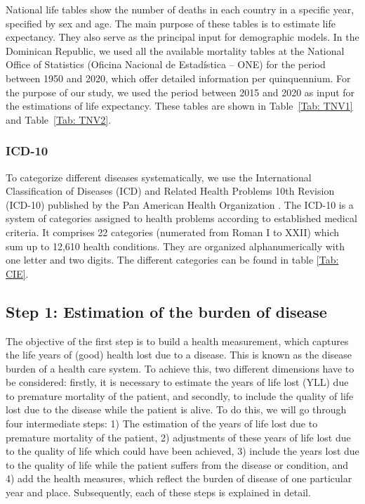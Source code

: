 \documentclass[11pt]{article}
\numberwithin{equation}{section}
\theoremstyle{remark}
\begin{document}
National life tables show the number of deaths in each country in a specific year, specified by sex and age. The main purpose of these tables is to estimate life expectancy. They also serve as the principal input for demographic models. In the Dominican Republic, we used all the available mortality tables at the National Office of Statistics (Oficina Nacional de Estadística – ONE) for the period between 1950 and 2020, which offer detailed information per quinquennium. For the purpose of our study, we used the period between 2015 and 2020 as input for the estimations of life expectancy. These tables are shown in Table~\ref{Tab: TNV1} and Table~\ref{Tab: TNV2}.

\subsubsection{ICD-10}
To categorize different diseases systematically, we use the International Classification of Diseases (ICD) and Related Health Problems 10th Revision (ICD-10) published by the Pan American Health Organization \parencite{OPS2008}. The ICD-10 is a system of categories assigned to health problems according to established medical criteria. It comprises 22 categories (numerated from Roman I to XXII) which sum up to 12,610 health conditions. They are organized alphanumerically with one letter and two digits. The different categories can be found in table \ref{Tab: CIE}.

\begin{table}[H]
    \caption{\label{Tab: CIE} Disease categories according to \citet{OPS2008}}
    \centering
    \setlength{\extrarowheight}{1pt}
    
\end{table}


\subsection{ Step 1: Estimation of the burden of disease }

The objective of the first step is to build a health measurement, which captures the life years of (good) health lost due to a disease. This is known as the disease burden of a health care system. To achieve this, two different dimensions have to be considered: firstly, it is necessary to estimate the years of life lost (YLL) due to premature mortality of the patient, and secondly, to include the quality of life lost due to the disease while the patient is alive. 
To do this, we will go through four intermediate steps: 1) The estimation of the years of life lost due to premature mortality of the patient, 2) adjustments of these years of life lost due to the quality of life which could have been achieved, 3) include the years lost due to the quality of life while the patient suffers from the disease or condition, and 4) add the health measures, which reflect the burden of disease of one particular year and place. Subsequently, each of these steps is explained in detail.
\end{document}
